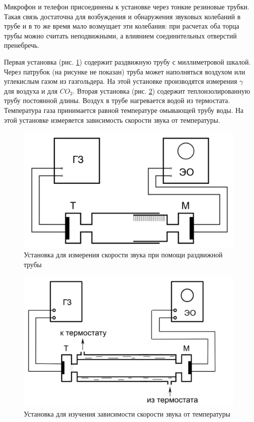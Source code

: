 \documentclass[a4paper,12pt]{article} %
\begin{document}
Микрофон и телефон присоединены к установке через тонкие резиновые трубки. Такая связь достаточна для возбуждения и обнаружения звуковых колебаний в трубе и в то же время мало возмущает эти колебания: при расчетах оба торца трубы можно считать неподвижными, а влиянием соединительных отверстий пренебречь.

Первая установка (рис. \ref{img1}) содержит раздвижную трубу с миллиметровой шкалой. Через патрубок (на рисунке не показан) труба может наполняться воздухом или углекислым газом из газгольдера. На этой установке производятся измерения $ \gamma $ для воздуха и для $ CO_2 $. Вторая установка (рис. \ref{img2}) содержит теплоизолированную трубу постоянной длины. Воздух в трубе нагревается водой из термостата. Температура газа принимается равной температуре омывающей трубу воды. На этой установке измеряется зависимость скорости звука от температуры.

\begin{figure}[H]
	\begin{center}
		\includegraphics[width=12cm]{ust1.jpg}
	\end{center}
	\caption{Установка для измерения скорости звука при помощи раздвижной трубы}
	\label{img1}
\end{figure}

\begin{figure}[H]
	\begin{center}
		\includegraphics[width=12cm]{ust2.jpg}
	\end{center}
	\caption{Установка для изучения зависимости скорости звука от температуры}
	\label{img2}
\end{figure}
\end{document}
